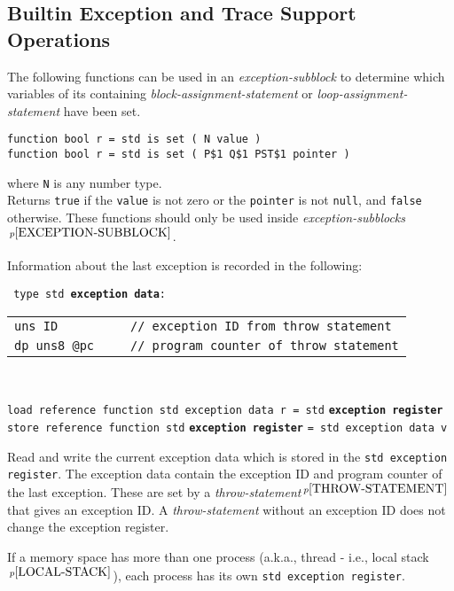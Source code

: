 \documentclass[12pt]{article}
\newcommand{\ttkey}[1]{{\tt \bfseries #1}}
\newcommand{\pagnote}[1]{$\,^{p\pageref{#1}}$}
\newenvironment{indpar}[1][0.3in]%
	{\begin{list}{}%
		     {\setlength{\itemsep}{0in}%
		      \setlength{\topsep}{0in}%
		      \setlength{\parsep}{1ex}%
		      \setlength{\labelwidth}{#1}%
		      \setlength{\leftmargin}{#1}%
		      \addtolength{\leftmargin}{\labelsep}}%
	 \item}%
	{\end{list}}
\begin{document}
\subsection{Builtin Exception and Trace Support Operations}
\label{BUILTIN-EXCEPTION-AND-TRACE-SUPPORT-OPERATIONS}

The following functions can be used in an {\em exception-subblock}
to determine which variables of its containing
{\em block-assignment-statement} or {\em loop-assignment-statement}
have been set.

{\tt function bool r = std is set ( N value )} \\
{\tt function bool r = std is set ( P\$1 Q\$1 PST\$1 pointer )}%
\label{IS-SET}
\begin{indpar}
where {\tt N} is any number type.
\\[1ex]
Returns {\tt true} if the {\tt value} is not zero or the {\tt pointer}
is not {\tt null}, and {\tt false} otherwise.
These functions should only be used inside
{\em exception-subblocks}\pagnote{EXCEPTION-SUBBLOCK}.
\end{indpar}

Information about the last exception is recorded in the following:

{\tt
type~std~\ttkey{exception data}: \\
\begin{tabular}[t]{@{~~~~~}l}
\tt uns~ID~~~~~~~~~~// exception ID from throw statement \\
\tt dp~uns8~@pc~~~~~// program counter of throw statement\\
\end{tabular} \\
}
{\tt load reference function std exception data r = std}
    \ttkey{exception register} \\
{\tt store reference function std} \ttkey{exception register}
    {\tt = std exception data v}
\begin{indpar}
Read and write the current exception data which is stored in the
{\tt std exception register}.
The exception data contain the exception ID and program counter
of the last exception.  These are set by
a {\em throw-statement}\pagnote{THROW-STATEMENT} that
gives an exception ID.   A {\em throw-statement} without an exception ID
does not change the exception register.

If a memory space has more than one process (a.k.a., thread - i.e., local
stack\pagnote{LOCAL-STACK}), each process has its own
{\tt std exception register}.
\end{indpar}
\end{document}
